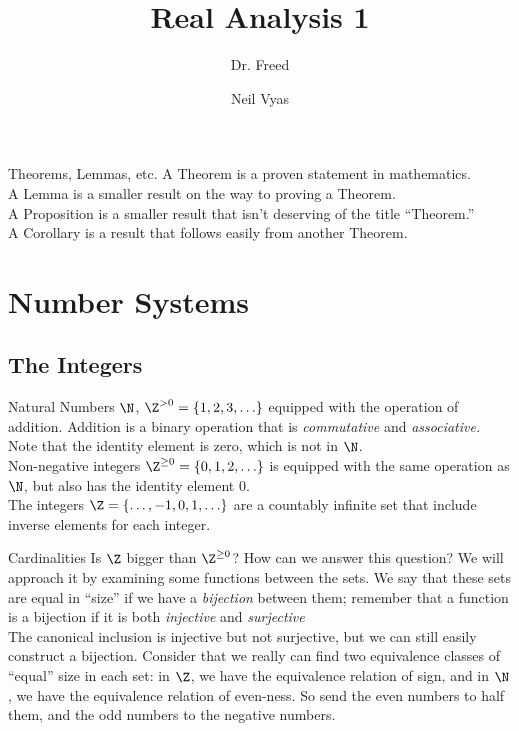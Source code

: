 \documentclass{notes}
\title{Real Analysis 1}
\subtitle{Dr. Freed}
\author{Neil Vyas}
\begin{document}
\maketitle
\tableofcontents

\begin{aside}{Theorems, Lemmas, etc.}
A Theorem is a proven statement in mathematics. \\
A Lemma is a smaller result on the way to proving a Theorem. \\
A Proposition is a smaller result that isn't deserving of the title ``Theorem.'' \\
A Corollary is a result that follows easily from another Theorem.
\end{aside}

\section{Number Systems}
\subsection{The Integers} %
Natural Numbers $\N$, $\Z^{>0} = \{1, 2, 3, \ldots\}$ equipped with the operation of addition.
Addition is a binary operation that is \emph{commutative} and \emph{associative.} Note that the 
identity element is zero, which is not in $\N$. \\

Non-negative integers $\Z^{\geq 0} = \{0 , 1, 2, \ldots\}$ is equipped with the same operation as 
$\N$, but also has the identity element 0. \\

The integers $\Z = \{\ldots, -1, 0, 1, \ldots\}$ are a countably infinite set that include inverse
elements for each integer. \\

\begin{aside}{Cardinalities}
Is $\Z$ bigger than $\Z^{\geq 0}$? How can we answer this question? We will approach it by examining 
some functions between the sets. We say that these sets are equal in ``size'' if we have a \emph{bijection}
between them; remember that a function is a bijection if it is both \emph{injective} and \emph{surjective}\\

The canonical inclusion is injective but not surjective, but we can still easily construct a bijection.
Consider that we really can find two equivalence classes of ``equal'' size in each set: in $\Z$, we have
the equivalence relation of sign, and in $\N$, we have the equivalence relation of even-ness. So send
the even numbers to half them, and the odd numbers to the negative numbers. \\
\end{aside}
\end{document}
